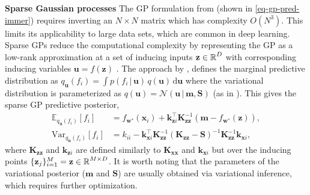 \documentclass{article}
\newcommand{\dataset}{\ensuremath{\mathcal{D}}}
\newcommand{\mbf}[1]{\mathbf{#1}}
\renewcommand{\mid}{\,|\,}
\newcommand{\MS}{\mbf{S}}
\newcommand{\vm}{\mbf{m}}
\newcommand{\vz}{\mbf{z}}
\newcommand{\vu}{\mbf{u}}
\newcommand{\vx}{\mbf{x}}
\newcommand{\vw}{\mbf{w}}
\newcommand{\MKzz}{\mbf{K}_{\mbf{z}\mbf{z}}}
\newcommand{\MKxx}{\mbf{K}_{\mbf{x}\mbf{x}}}
\newcommand{\vkzs}{\mbf{k}_{\mbf{z}i}}
\newcommand{\vk}{\mbf{k}}
\newcommand{\myexpect}{\mathbb{E}}
\begin{document}




\textbf{Sparse Gaussian processes}
The GP formulation from \citet{immer2021improving} (shown in \cref{eq-gp-pred-immer})
requires inverting an $N\times N$ matrix which has complexity $O(N^3)$.
This limits its applicability to large data sets, which are common in deep learning.
Sparse GPs reduce the computational complexity by representing the GP as a low-rank approximation at a set of inducing
inputs $\vz \in \R^{D}$ with corresponding inducing variables $\vu = f(\vz)$ \citep[see][for an early overview]{quinonero2005unifying}.
The approach by \citet{titsias2009variational} \citep[also used in the DTC approximation, see][]{quinonero2005unifying},
defines the marginal predictive distribution as $q_{\vu}(f_i)  = \int p(f_i  \mid \vu) \, q(\vu) \, \mathrm{d}\vu$ where
the variational distribution is parameterized as $q(\vu) = \mathcal{N}\left(\vu \mid \vm, \MS \right)$ (as in \citet{titsias2009variational,hensman2013gaussian}).
This gives the sparse GP predictive posterior,
\begin{subequations}  \label{eq-svgp-pred}
\begin{align}
  \myexpect_{q_{\vu}(f_i)}[f_i] &= f_{\vw^{*}}(\vx_{i}) + \vk_{\vz i}^{\top}\MKzz^{-1}(\vm - f_{\vw^{*}}(\vz)), \\
  \mathrm{Var}_{q_{\vu}(f_i)}[f_i] &= k_{ii} - \vk_{\vx i}^\top \MKzz^{-1}( \MKzz - \MS )^{-1} \MKzz^{-1} \vk_{\vx i},  \nonumber
\end{align}
\end{subequations}
where $\MKzz$ and $\vkzs$ are defined similarly to $\MKxx$ and $\vk_{\vx i}$ but over the inducing points $\{\vz_j\}_{i=1}^M=\vz \in \R^{M \times D}$.%
It is worth noting that the parameters of the variational posterior ($\vm$ and $\MS$) are usually obtained via variational
inference, which requires further optimization.%
\end{document}
